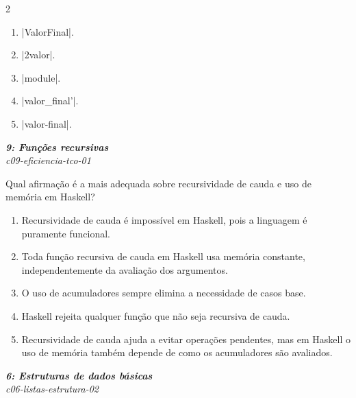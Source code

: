 \documentclass[a4paper,10pt,brazil]{article}
\begin{document}
\begin{multicols}{2}
\begin{enumerate}
  \item \haskellinline|ValorFinal|.

  \item \haskellinline|2valor|.

  \item \haskellinline|module|.

  \item \haskellinline|valor_final'|.

  \item \haskellinline|valor-final|.


\end{enumerate}

\begin{flushright}
  \footnotesize
  \textit{\textbf{9: Funções recursivas}}\\
  \textit{c09-eficiencia-tco-01}\\

\end{flushright}
Qual afirmação é a mais adequada sobre recursividade de cauda e uso de memória em Haskell?

\begin{enumerate}
  \item Recursividade de cauda é impossível em Haskell, pois a linguagem é puramente funcional.

  \item Toda função recursiva de cauda em Haskell usa memória constante, independentemente da avaliação dos argumentos.

  \item O uso de acumuladores sempre elimina a necessidade de casos base.

  \item Haskell rejeita qualquer função que não seja recursiva de cauda.

  \item Recursividade de cauda ajuda a evitar operações pendentes, mas em Haskell o uso de memória também depende de como os acumuladores são avaliados.


\end{enumerate}

\begin{flushright}
  \footnotesize
  \textit{\textbf{6: Estruturas de dados básicas}}\\
  \textit{c06-listas-estrutura-02}\\


\end{flushright}
\end{multicols}
\end{document}
